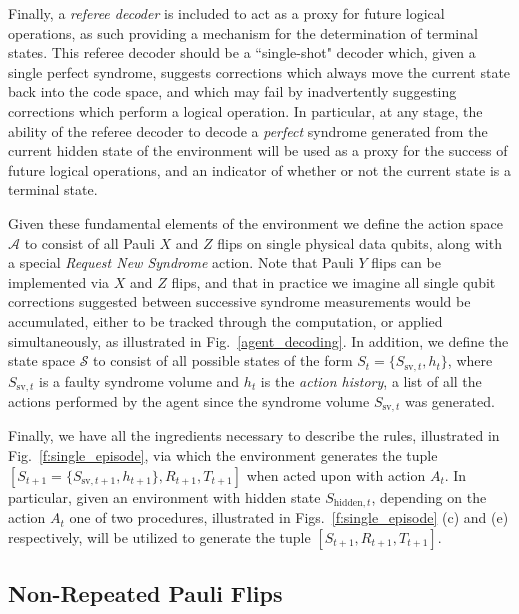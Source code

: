 \documentclass[twocolumn,preprintnumbers,amsmath,amssymb,notitlepage,nofootinbib,longbibliography,superscriptaddress,aps,pra,10pt]{revtex4-1}
\begin{document}
	Finally, a \emph{referee decoder} is included to act as a proxy for future logical operations, as such providing a mechanism for the determination of terminal states.
	This referee decoder should be a ``single-shot" decoder which, given a single perfect syndrome, suggests corrections which always move the current state back into the code space, and which may fail by inadvertently suggesting corrections which perform a logical operation.
	In particular, at any stage, the ability of the referee decoder to decode a \emph{perfect} syndrome generated from the current hidden state of the environment will be used as a proxy for the success of future logical operations, and an indicator of whether or not the current state is a terminal state.

	Given these fundamental elements of the environment we define the action space $\mathcal{A}$ to consist of all Pauli $X$ and $Z$ flips on single physical data qubits, along with a special \emph{Request New Syndrome} action.
	Note that Pauli $Y$ flips can be implemented via $X$ and $Z$ flips, and that in practice we imagine all single qubit corrections suggested between successive syndrome measurements would be accumulated, either to be tracked through the computation, or applied simultaneously, as illustrated in Fig.~\ref{agent_decoding}.
	In addition, we define the state space $\mathcal{S}$ to consist of all possible states of the form $S_{t} = \{S_{\mathrm{sv},t},h_t\}$, where $S_{\mathrm{sv},t}$ is a faulty syndrome volume and $h_t$ is the \emph{action history}, a list of all the actions performed by the agent since the syndrome volume $S_{\mathrm{sv},t}$ was generated.

	Finally, we have all the ingredients necessary to describe the rules, illustrated in Fig.~\ref{f:single_episode}, via which the environment generates the tuple $[S_{t+1} = \{S_{\mathrm{sv},t+1},h_{t+1}\},R_{t+1},T_{t+1}]$ when acted upon with action $A_t$.
	In particular, given an environment with hidden state $S_{\mathrm{hidden},t}$, depending on the action $A_t$ one of two procedures, illustrated in Figs.~\ref{f:single_episode} (c) and (e) respectively, will be utilized to generate the tuple $[S_{t+1},R_{t+1},T_{t+1}]$.

	\subsection{Non-Repeated Pauli Flips}\label{s:non-repeated}
\end{document}
